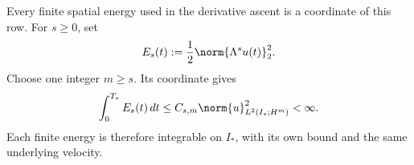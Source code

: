 Every finite spatial energy used in the derivative ascent is a coordinate of
this row.  For \(s\geq0\), set
\begin{equation}\label{eq:SectionThreeSpatialEnergy}
  E_s(t):=\frac12\norm{\Lambda^su(t)}_2^2.
\end{equation}
Choose one integer \(m\geq s\).  Its coordinate gives
\begin{equation}\label{eq:SectionThreeAllSpatialEnergies}
  \int_0^{T_*}E_s(t)\,dt
  \leq
  C_{s,m}\norm{u}_{L^2(I_*;H^m)}^2
  <\infty.
\end{equation}
Each finite energy is therefore integrable on \(I_*\), with its own bound and
the same underlying velocity.
